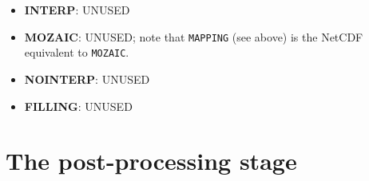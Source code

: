 \begin{itemize}
{\bf Support of vector fields with the SCRIPR remappings}

Vector mapping is NOT supported is not and will not be supported by
OASIS3-MCT. For proper treatment of vector fields, the component model
has to send the 3 components of the vector projected in a Cartesian
coordinate system.

\item {\bf INTERP}: UNUSED

\item {\bf MOZAIC}: UNUSED; note that {\tt MAPPING} (see above) is the NetCDF
  equivalent to {\tt MOZAIC}.

\item {\bf NOINTERP}: UNUSED

\item {\bf FILLING}: UNUSED

\end{itemize}

\section{The post-processing stage}
\label{subsec_cooking}

